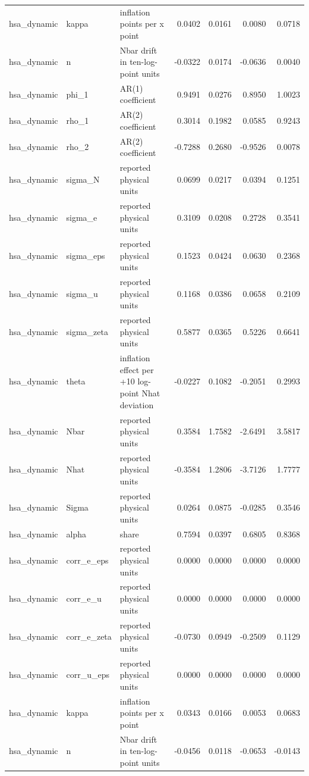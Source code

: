 \begin{tabular}{lllrrrr}
hsa\_dynamic & kappa & inflation points per x point & 0.0402 & 0.0161 & 0.0080 & 0.0718 \\
hsa\_dynamic & n & Nbar drift in ten-log-point units & -0.0322 & 0.0174 & -0.0636 & 0.0040 \\
hsa\_dynamic & phi\_1 & AR(1) coefficient & 0.9491 & 0.0276 & 0.8950 & 1.0023 \\
hsa\_dynamic & rho\_1 & AR(2) coefficient & 0.3014 & 0.1982 & 0.0585 & 0.9243 \\
hsa\_dynamic & rho\_2 & AR(2) coefficient & -0.7288 & 0.2680 & -0.9526 & 0.0078 \\
hsa\_dynamic & sigma\_N & reported physical units & 0.0699 & 0.0217 & 0.0394 & 0.1251 \\
hsa\_dynamic & sigma\_e & reported physical units & 0.3109 & 0.0208 & 0.2728 & 0.3541 \\
hsa\_dynamic & sigma\_eps & reported physical units & 0.1523 & 0.0424 & 0.0630 & 0.2368 \\
hsa\_dynamic & sigma\_u & reported physical units & 0.1168 & 0.0386 & 0.0658 & 0.2109 \\
hsa\_dynamic & sigma\_zeta & reported physical units & 0.5877 & 0.0365 & 0.5226 & 0.6641 \\
hsa\_dynamic & theta & inflation effect per +10 log-point Nhat deviation & -0.0227 & 0.1082 & -0.2051 & 0.2993 \\
hsa\_dynamic & Nbar & reported physical units & 0.3584 & 1.7582 & -2.6491 & 3.5817 \\
hsa\_dynamic & Nhat & reported physical units & -0.3584 & 1.2806 & -3.7126 & 1.7777 \\
hsa\_dynamic & Sigma & reported physical units & 0.0264 & 0.0875 & -0.0285 & 0.3546 \\
hsa\_dynamic & alpha & share & 0.7594 & 0.0397 & 0.6805 & 0.8368 \\
hsa\_dynamic & corr\_e\_eps & reported physical units & 0.0000 & 0.0000 & 0.0000 & 0.0000 \\
hsa\_dynamic & corr\_e\_u & reported physical units & 0.0000 & 0.0000 & 0.0000 & 0.0000 \\
hsa\_dynamic & corr\_e\_zeta & reported physical units & -0.0730 & 0.0949 & -0.2509 & 0.1129 \\
hsa\_dynamic & corr\_u\_eps & reported physical units & 0.0000 & 0.0000 & 0.0000 & 0.0000 \\
hsa\_dynamic & kappa & inflation points per x point & 0.0343 & 0.0166 & 0.0053 & 0.0683 \\
hsa\_dynamic & n & Nbar drift in ten-log-point units & -0.0456 & 0.0118 & -0.0653 & -0.0143 \\

\end{tabular}

